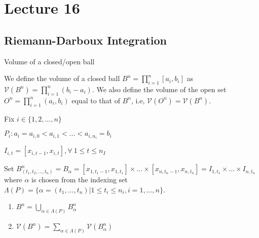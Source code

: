\documentclass[../Analysis-3.tex]{subfiles}
\begin{document}
\chapter*{Lecture 16} %
\setcounter{chapter}{16} %
\setcounter{section}{0}

\section{Riemann-Darboux Integration}



\begin{Def}{Volume of a closed/open ball}{}

  We define the volume of a closed ball $B^n = \prod \limits_{i=1}^n [a_i, b_i]$ as $\mathcal{V}(B^n) = \prod \limits_{i=1}^n (b_i - a_i).$ We also define the volume of the open set $O^n = \prod \limits _{i=1}^n (a_i, b_i)$ equal to that of $B^n$, i.e, $\mathcal{V}(O^n) = \mathcal{V}(B^n)$.

\end{Def}

\begin{notnBox}

  Fix $i \in \{1,2, \dots, n\}$

  $P_i: a_i = a_{i,0} < a_{i,1} < \dots < a_{i,n_i} = b_i$

  $I_{i,t} = [x_{i,t-1}, x_{i,t}], \forall \ 1 \leq t \leq n_I$

  Set $B_{(t_1,t_2,\dots ,t_n)}^n = B_\alpha = [x_{1,t_1-1}, x_{1,t_1}] \times \dots \times [x_{n,t_n-1}, x_{n,t_n}] = I_{1,t_1} \times \dots \times I_{n,t_n}$ where $\alpha$ is chosen from the indexing set $\Lambda (P) = \{\alpha = (t_1,\dots ,t_n) | 1 \leq t_i \leq n_i, i=1, \dots , n\}$.


\end{notnBox}

\begin{noteBox}

  \begin{enumerate}
    \item $B^n = \bigcup \limits _{\alpha \in \Lambda (P)} B^n_\alpha$
    \item $\mathcal{V}(B^n) = \sum \limits _{\alpha \in \Lambda (P)} \mathcal{V}(B_\alpha ^n)$
  \end{enumerate}

\end{noteBox}
\end{document}
